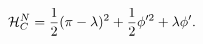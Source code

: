 \begin{equation}
 {\cal{H}}^N_C=\frac{1}{2}(\pi-\lambda)^2+\frac{1}{2}\phi'^2+\lambda\phi'.
 \label{a54}
 \end{equation}

